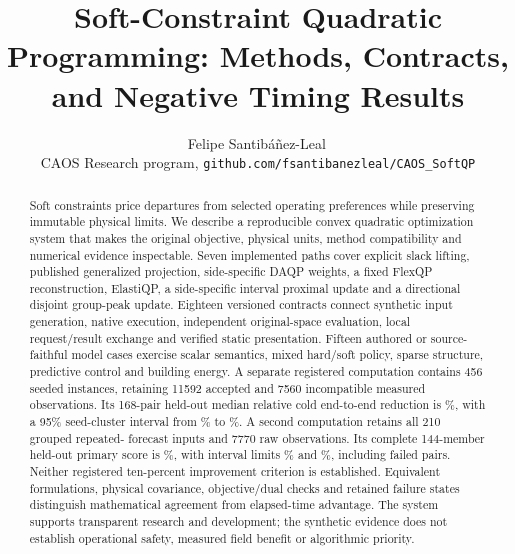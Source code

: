 \documentclass[11pt]{article}
\title{Soft-Constraint Quadratic Programming: Methods, Contracts, and Negative Timing Results}
\author{Felipe Santib\'a\~nez-Leal\,\orcidlink{0000-0002-0150-3246}\\
\small CAOS Research program, \texttt{github.com/fsantibanezleal/CAOS\_SoftQP}}
\date{\docdate}
\begin{document}
\maketitle
\thispagestyle{plain}
\headerblock
\begin{abstract}
Soft constraints price departures from selected operating preferences while
preserving immutable physical limits. We describe a reproducible convex quadratic
optimization system that makes the original objective, physical units, method
compatibility and numerical evidence inspectable. Seven implemented paths cover
explicit slack lifting, published generalized projection, side-specific DAQP
weights, a fixed FlexQP reconstruction, ElastiQP, a side-specific interval
proximal update and a directional disjoint group-peak update. Eighteen versioned
contracts connect synthetic input generation, native execution, independent
original-space evaluation, local request/result exchange and verified static
presentation. Fifteen authored or source-faithful model cases exercise scalar
semantics, mixed hard/soft policy, sparse structure, predictive control and
building energy. A separate registered computation contains 456 seeded instances,
retaining 11592 accepted and 7560 incompatible measured observations. Its
168-pair held-out median relative cold end-to-end reduction is
\OriginalEstimate\%, with a 95\% seed-cluster interval from \OriginalLower\%
to \OriginalUpper\%. A second computation retains all 210 grouped repeated-
forecast inputs and 7770 raw observations. Its complete 144-member held-out
primary score is \PrimaryEstimate\%, with interval limits \PrimaryLower\%
and \PrimaryUpper\%, including \PrimaryFailed{} failed pairs. Neither
registered ten-percent improvement criterion is established. Equivalent
formulations, physical covariance, objective/dual checks and retained failure
states distinguish mathematical agreement from elapsed-time advantage. The
system supports transparent research and development; the synthetic evidence
does not establish operational safety, measured field benefit or algorithmic priority.
\end{abstract}
















\end{document}
